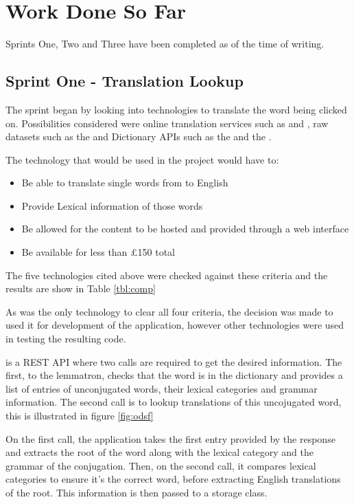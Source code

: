 \chapter{Work Done So Far}
Sprints One, Two and Three have been completed as of the time of writing.

\section{Sprint One - Translation Lookup}
The sprint began by looking into technologies to translate the word being clicked on. Possibilities considered were online translation services such as \textcite{googletranslate} and \textcite{bingtranslate}, raw datasets such as the \textcite{dictCC} and Dictionary APIs such as the \textcite{oxford} and the \textcite{collins}. 

The technology that would be used in the project would have to:
\begin{itemize}
	\item Be able to translate single words from to English
	\item Provide Lexical information of those words
	\item Be allowed for the content to be hosted and provided through a web interface
	\item Be available for less than \pounds150 total
\end{itemize}

The five technologies cited above were checked against these criteria and the results are show in Table \ref{tbl:comp}



As \textcite{oxford} was the only technology to clear all four criteria, the decision was made to used it for development of the application, however other technologies were used in testing the resulting code.

\textcite{oxford} is a REST API where two calls are required to get the desired information. The first, to the lemmatron, checks that the word is in the dictionary and provides a list of entries of unconjugated words, their lexical categories and grammar information. The second call is to lookup translations of this uncojugated word, this is illustrated in figure \ref{fig:odsf}



On the first call, the application takes the first entry provided by the response and extracts the root of the word along with the lexical category and the grammar of the conjugation. Then, on the second call, it compares lexical categories to ensure it's the correct word, before extracting English translations of the root. This information is then passed to a storage class.


